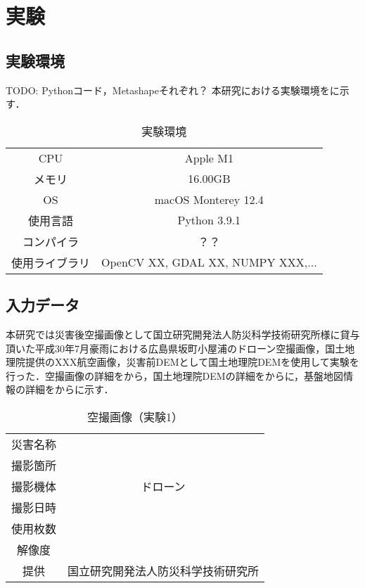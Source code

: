 \chapter{実験}
  \section{実験環境}
  TODO: Pythonコード，Metashapeそれぞれ？
    本研究における実験環境をに示す．

    \begin{table}[b]
      \centering
      \caption{実験環境}
      \label{実験環境}
      \begin{tabular}{cc}
        \hline
        CPU & Apple M1 \\
        メモリ & 16.00GB \\
        OS & macOS Monterey 12.4 \\
        使用言語 & Python 3.9.1 \\
        コンパイラ & ？？ \\
        使用ライブラリ & OpenCV XX, GDAL XX, NUMPY XXX,... \\ \hline
      \end{tabular}
    \end{table}


  \section{入力データ}
    本研究では災害後空撮画像として国立研究開発法人防災科学技術研究所様に貸与頂いた平成30年7月豪雨における広島県坂町小屋浦のドローン空撮画像\cite{}，国土地理院提供のXXX航空画像，災害前DEMとして国土地理院DEMを使用して実験を行った．空撮画像の詳細をから，国土地理院DEMの詳細をからに，基盤地図情報の詳細をからに示す．

    \begin{table}[b]
      \centering
      \caption{空撮画像（実験1）}
      \label{空撮画像1}
      \begin{tabular}{cc}
        \hline
        災害名称 &  \\
        撮影箇所 &  \\
        撮影機体 & ドローン \\
        撮影日時 &  \\
        使用枚数 & \\
        解像度 &  \\
        提供 & 国立研究開発法人防災科学技術研究所 \\ \hline
      \end{tabular}
    \end{table}

